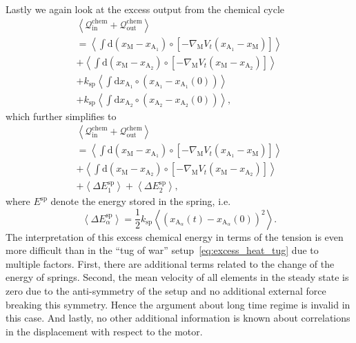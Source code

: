 \documentclass[aps,pre,twocolumn,showpacs,showkeys,superscriptaddress,floatfix]{revtex4-1}
\newcommand{\rmd}{{\mathrm d}}
\begin{document}
Lastly we again look at the excess output from the chemical cycle
\begin{multline*}
\left\langle 
{\mathcal Q}_\text{in}^\text{chem} + {\mathcal Q}_\text{out}^\text{chem} 
\right\rangle 
\\
= 
\left\langle 
\int \rmd \left( x_\text{M} - x_{\text{A}_1} \right) \circ \left[ - \nabla_\text{M} V_t( x_{\text{A}_1} - x_\text{M} ) \right]
\right\rangle 
\\
+
\left\langle 
\int \rmd \left( x_\text{M} - x_{\text{A}_2} \right) \circ \left[ - \nabla_\text{M} V_t( x_\text{M} - x_{\text{A}_2} ) \right] 
\right\rangle 
\\
+ k_\text{sp} \left\langle \int \rmd x_{\text{A}_1} \circ \left( x_{\text{A}_1} - x_{\text{A}_1}(0) \right) \right\rangle
\\ 
+ k_\text{sp} \left\langle \int \rmd x_{\text{A}_2} \circ \left( x_{\text{A}_2} - x_{\text{A}_2}(0) \right) \right\rangle
,
\end{multline*} 
which further simplifies to 
\begin{multline*}
\left\langle 
{\mathcal Q}_\text{in}^\text{chem} + {\mathcal Q}_\text{out}^\text{chem} 
\right\rangle 
\\
= 
\left\langle 
\int \rmd \left( x_\text{M} - x_{\text{A}_1} \right) \circ \left[ - \nabla_\text{M} V_t( x_{\text{A}_1} - x_\text{M} ) \right]
\right\rangle 
\\
+
\left\langle 
\int \rmd \left( x_\text{M} - x_{\text{A}_2} \right) \circ \left[ - \nabla_\text{M} V_t( x_\text{M} - x_{\text{A}_2} ) \right]
\right\rangle 
\\
+ \left\langle 
\Delta E^\text{sp}_1 
\right\rangle
+ \left\langle 
\Delta E^\text{sp}_2 
\right\rangle ,
\end{multline*} 
where $E^\text{sp}$ denote the energy stored in the spring, i.e. 
\[
\left\langle \Delta E^\text{sp}_\alpha \right\rangle 
= 
\frac{1}{2} k_\text{sp}
\left\langle
\left( 
x_{\text{A}_\alpha}(t) 
- 
x_{\text{A}_\alpha}(0)  
\right)^2 
\right\rangle
.
\]
The interpretation of this excess chemical energy in terms of the tension is even more difficult than in the ``tug of war'' setup~\eqref{eq:excess_heat_tug} due to multiple factors.
First, there are additional terms related to the change of the energy of springs.
Second, the mean velocity of all elements in the steady state is zero due to the anti-symmetry of the setup and no additional external force breaking this symmetry. 
Hence the argument about long time regime is invalid in this case.
And lastly, no other additional information is known about correlations in the displacement with respect to the motor. 
\end{document}
